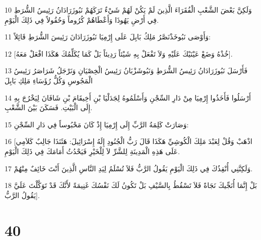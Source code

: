 \par 10 وَلَكِنَّ بَعْضَ الشَّعْبِ الْفُقَرَاءَ الَّذِينَ لَمْ يَكُنْ لَهُمْ شَيْءٌ تَرَكَهُمْ نَبُوزَرَادَانُ رَئِيسُ الشُّرَطِ فِي أَرْضِ يَهُوذَا وَأَعْطَاهُمْ كُرُوماً وَحُقُولاً فِي ذَلِكَ الْيَوْمِ.
\par 11 وَأَوْصَى نَبُوخَذْنَصَّرُ مَلِكُ بَابِلَ عَلَى إِرْمِيَا نَبُوزَرَادَانَ رَئِيسَ الشُّرَطِ قَائِلاً:
\par 12 [خُذْهُ وَضَعْ عَيْنَيْكَ عَلَيْهِ وَلاَ تَفْعَلْ بِهِ شَيْئاً رَدِيئاً بَلْ كَمَا يُكَلِّمُكَ هَكَذَا افْعَلْ مَعَهُ].
\par 13 فَأَرْسَلَ نَبُوزَرَادَانُ رَئِيسُ الشُّرَطِ وَنَبُوشَزْبَانُ رَئِيسُ الْخِصْيَانِ وَنَرْجَلُ شَرَاصَرُ رَئِيسُ الْمَجُوسِ وَكُلُّ رُؤَسَاءِ مَلِكِ بَابِلَ
\par 14 أَرْسَلُوا فَأَخَذُوا إِرْمِيَا مِنْ دَارِ السِّجْنِ وَأَسْلَمُوهُ لِجَدَلْيَا بْنِ أَخِيقَامَ بْنِ شَافَانَ لِيَخْرُجَ بِهِ إِلَى الْبَيْتِ. فَسَكَنَ بَيْنَ الشَّعْبِ.
\par 15 وَصَارَتْ كَلِمَةُ الرَّبِّ إِلَى إِرْمِيَا إِذْ كَانَ مَحْبُوساً فِي دَارِ السِّجْنِ:
\par 16 [اذْهَبْ وَقُلْ لِعَبْدَ مَلِكَ الْكُوشِيِّ هَكَذَا قَالَ رَبُّ الْجُنُودِ إِلَهُ إِسْرَائِيلَ: هَئَنَذَا جَالِبٌ كَلاَمِي عَلَى هَذِهِ الْمَدِينَةِ لِلشَّرِّ لاَ لِلْخَيْرِ فَيَحْدُثُ أَمَامَكَ فِي ذَلِكَ الْيَوْمِ.
\par 17 وَلَكِنَّنِي أُنْقِذُكَ فِي ذَلِكَ الْيَوْمِ يَقُولُ الرَّبُّ فَلاَ تُسْلَمُ لِيَدِ النَّاسِ الَّذِينَ أَنْتَ خَائِفٌ مِنْهُمْ.
\par 18 بَلْ إِنَّمَا أُنَجِّيكَ نَجَاةً فَلاَ تَسْقُطُ بِالسَّيْفِ بَلْ تَكُونُ لَكَ نَفْسُكَ غَنِيمَةً لأَنَّكَ قَدْ تَوَكَّلْتَ عَلَيَّ يَقُولُ الرَّبُّ].

\chapter{40}

